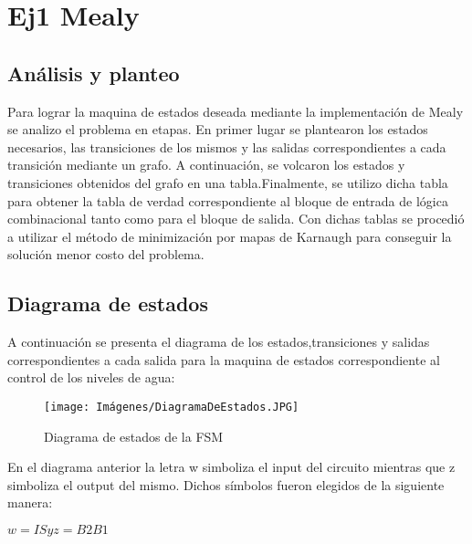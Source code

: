 


\section{Ej1 Mealy}
\subsection{Análisis y planteo}
Para lograr la maquina de estados deseada mediante la implementaci\'{o}n de Mealy se analizo el problema en etapas. En primer lugar se plantearon los estados necesarios, las transiciones de los mismos y las salidas correspondientes a cada transición mediante un grafo. A continuación, se volcaron los estados y transiciones obtenidos del grafo en una tabla.Finalmente, se utilizo dicha tabla para obtener la tabla de verdad correspondiente al bloque de entrada de lógica combinacional tanto como para el bloque de salida. Con dichas tablas se procedió a utilizar el método de minimizaci\'{o}n por mapas de Karnaugh para conseguir la solución menor costo del problema.
\subsection{Diagrama de estados}
A continuación se presenta el diagrama de los estados,transiciones y salidas correspondientes a cada salida para la maquina de estados correspondiente al control de los niveles de agua:
\begin{center}
\begin{figure}
\texttt{[image: Imágenes/DiagramaDeEstados.JPG]} 
\caption{Diagrama de estados de la FSM}
\end{figure}
\end{center}
En el diagrama anterior la letra w simboliza el input del circuito mientras que z simboliza el output del mismo. Dichos símbolos fueron elegidos de la siguiente manera:
\begin{center}
$w=IS y z=B2B1$
\end{center}




